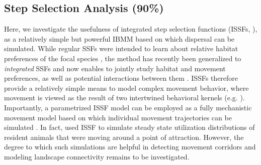 \documentclass[abstract=on,10pt,a4paper,bibliography=totocnumbered]{article}
\begin{document}
\subsection{Step Selection Analysis (90\%)}
Here, we investigate the usefulness of integrated step selection functions
(ISSFs, \citealp{Avgar.2016}), as a relatively simple but powerful IBMM based on
which dispersal can be simulated. While regular SSFs were intended to learn
about relative habitat preferences of the focal species \citep{Fortin.2005,
Thurfjell.2014, Avgar.2017}, the method has recently been generalized to
\textit{integrated} SSFs and now enables to jointly study habitat and movement
preferences, as well as potential interactions between them \citep{Avgar.2016,
Signer.2017, Fieberg.2020}. ISSFs therefore provide a relatively simple means to
model complex movement behavior, where movement is viewed as the result of two
intertwined behavioral kernels (e.g. \citealp{Prokopenko.2017, Munden.2020}).
Importantly, a parametrized ISSF model can be employed as a fully mechanistic
movement model based on which individual movement trajectories can be simulated
\citep{Avgar.2016, Signer.2017}. In fact, \cite{Signer.2017} used ISSF to
simulate steady state utilization distributions of resident animals that were
moving around a point of attraction. However, the degree to which such
simulations are helpful in detecting movement corridors and modeling landscape
connectivity remains to be investigated.

\end{document}
